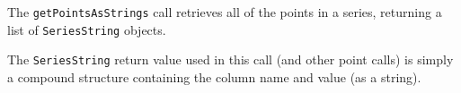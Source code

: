 The \verb+getPointsAsStrings+ call retrieves all of the points in a series, returning a list of
\verb+SeriesString+ objects.

The \verb+SeriesString+ return value used in this call (and other point calls) is simply a compound
structure containing the column name and value (as a string).

